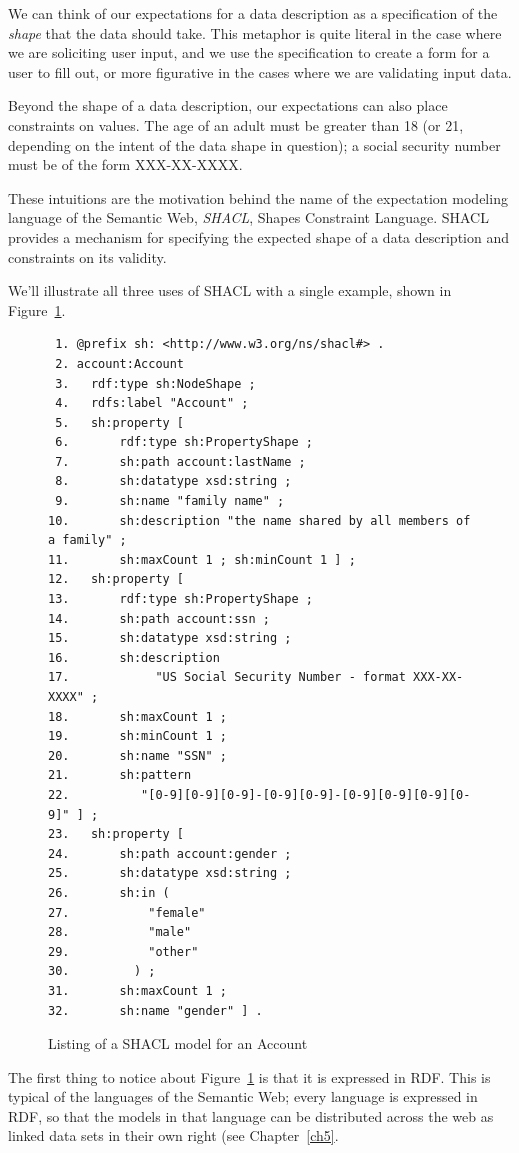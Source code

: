 We can think of our expectations for a data description as a specification of the \emph{shape} that the data should take.  
This metaphor is quite literal in the case where we are soliciting user input, and we use the specification to create a 
form for a user to fill out, or more figurative in the cases where we are validating input data. 

Beyond the shape of a data description, our expectations can also place constraints on values.  
The age of an adult must be greater than 18 (or 21, depending on the intent of the data shape in question);  
a social security number must be of the form XXX-XX-XXXX.

These intuitions are the motivation behind the name of the expectation modeling language of the Semantic Web, \emph{SHACL}, 
Shapes Constraint Language.  SHACL provides a mechanism for specifying the expected shape of a data description and 
constraints on its validity.

We'll illustrate all three uses of SHACL with a single example, shown in Figure~\ref{fig:ch7.account}.

\begin{figure}
  \begin{lstlisting}
 1. @prefix sh: <http://www.w3.org/ns/shacl#> .
 2. account:Account
 3.   rdf:type sh:NodeShape ;
 4.   rdfs:label "Account" ;
 5.   sh:property [
 6.       rdf:type sh:PropertyShape ;
 7.       sh:path account:lastName ;
 8.       sh:datatype xsd:string ;
 9.       sh:name "family name" ;
10.       sh:description "the name shared by all members of a family" ;
11.       sh:maxCount 1 ; sh:minCount 1 ] ;
12.   sh:property [
13.       rdf:type sh:PropertyShape ;
14.       sh:path account:ssn ;
15.       sh:datatype xsd:string ;
16.       sh:description
17.            "US Social Security Number - format XXX-XX-XXXX" ;
18.       sh:maxCount 1 ;
19.       sh:minCount 1 ;
20.       sh:name "SSN" ;
21.       sh:pattern
22.          "[0-9][0-9][0-9]-[0-9][0-9]-[0-9][0-9][0-9][0-9]" ] ;
23.   sh:property [
24.       sh:path account:gender ;
25.       sh:datatype xsd:string ;
26.       sh:in (
27.           "female"
28.           "male"
29.           "other"
30.         ) ;
31.       sh:maxCount 1 ;
32.       sh:name "gender" ] .
  \end{lstlisting}
  \caption{Listing of a SHACL model for an Account}
  \label{fig:ch7.account}
\end{figure}

The first thing to notice about Figure~\ref{fig:ch7.account} is that it is expressed in RDF.  This is typical of the languages of the Semantic Web; every language is expressed in RDF, so that the models in that language can be distributed across the web as linked data sets in their own right (see Chapter~\ref{ch5}. 

